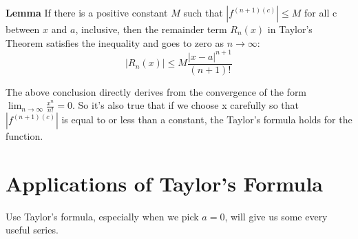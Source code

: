 \documentclass[11pt]{article}
\begin{document}
\begin{tcolorbox}[
	enhanced, 
	width=\textwidth, 
	fontupper=\normalsize,%
	drop fuzzy shadow southwest,
	boxrule=0.4pt,
	sharp corners,
	colframe=yellow!80!black,
	colback=yellow!10]
	
\textbf{\color{RoyalBlue} Lemma} If there is a positive constant $M$ such that $|f^{(n+1)(c)}| \leqslant M$ for all c between $x$ and $a$,  inclusive,  then the remainder term $R_n(x)$ in Taylor's Theorem satisfies the inequality and goes to zero as $n \to \infty$: 
$$
|R_n(x)| \leqslant M \frac{|x-a|^{n+1}}{(n+1)!}
$$

\end{tcolorbox}

The above conclusion directly derives from the convergence of the form $\displaystyle \lim_{n \to \infty} \frac{x^n}{n!} = 0$.  So it's also true that  if we choose x carefully so that $|f^{(n+1)(c)}|$ is equal to or less than a constant,  the Taylor's formula holds for the function.





\section {\large Applications of Taylor's Formula}

Use Taylor's formula,  especially when we pick $a=0$,  will give us some every useful series.  
\end{document}
